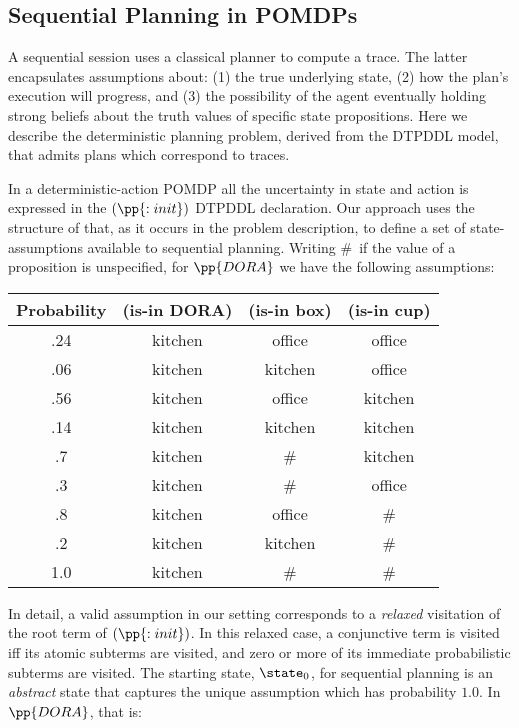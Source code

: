 

\subsection{Sequential Planning in POMDPs}

A sequential session uses a classical planner to compute a trace. The
latter encapsulates assumptions about: (1) the true underlying state,
(2) how the plan's execution will progress, and (3) the possibility of
the agent eventually holding strong beliefs about the truth values of
specific state propositions. Here we describe the deterministic
planning problem, derived from the DTPDDL model, that admits plans
which correspond to traces.

In a deterministic-action POMDP all the uncertainty in state and
action is expressed in the $(\pp{:init})$ DTPDDL declaration. Our
approach uses the structure of that, as it occurs in the problem
description, to define a set of state-assumptions available to
sequential planning.
Writing \#\ if the value of a proposition is unspecified, for
$\pp{DORA}$ we have the following assumptions:

\small
\begin{tabular}{cccc}
\hline
Probability & (is-in DORA)  & (is-in box)  & (is-in cup) \\
\hline
.24 & kitchen & office & office \\
.06 & kitchen & kitchen & office \\
.56 & kitchen & office & kitchen \\
.14 & kitchen & kitchen & kitchen \\
.7 & kitchen & \# &  kitchen\\
.3 & kitchen & \# & office \\
.8 & kitchen & office & \# \\
.2 & kitchen & kitchen & \# \\
1.0 & kitchen & \# & \# \\
\hline
\end{tabular}
\normalsize

\noindent In detail, a valid assumption in our setting corresponds to a {\em
relaxed} visitation of the root term of $(\pp{:init})$. In this
relaxed case, a conjunctive term is visited iff its atomic subterms
are visited, and zero or more of its immediate probabilistic subterms
are visited. The starting state, $\state_0$, for sequential planning
is an {\em abstract} state that captures the unique assumption which
has probability $1.0$. In $\pp{DORA}$, that is:

